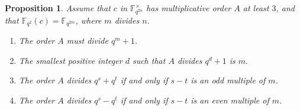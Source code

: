 \documentclass[10pt]{amsart}
\theoremstyle{plain}
\newtheorem{proposition}[theorem]{Proposition}
\theoremstyle{definition}
\theoremstyle{remark}
\numberwithin{equation}{section}
\newcommand\FF{\mathbb{F}}
\begin{document}
\begin{proposition}
\label{numbth} Assume that $c$ in $\FF_{q^{2n}}^\times$
has multiplicative order $A$ at least $3$, and that
$\FF_{q^2}(c)=\FF_{q^{2m}}$, where $m$ divides $n$.
\begin{enumerate}
\item[(i)] The order $A$ must divide $q^m+1$. 
\item[(ii)] The smallest positive integer $d$ such that $A$ 
divides $q^d+1$ is $m.$
\item[(iii)] The order $A$ divides $q^s+q^t$ if and only if 
$s-t$ is an odd multiple of $m$.
\item[(iv)] The order $A$ divides $q^s-q^t$ if and only if 
$s-t$ is an even multiple of $m$.
\end{enumerate}
\end{proposition}
\end{document}
